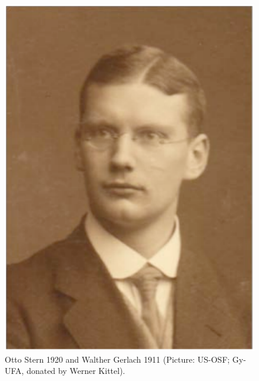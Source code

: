 \documentclass{article}
\begin{document}
\begin{figure}
\begin{center}
\includegraphics[scale=0.505]{figures/Gerlach1911}
\caption{Otto Stern 1920 and Walther Gerlach 1911 (Picture: US-OSF; Gy-UFA, donated by Werner Kittel).}
\label{fig:SternGerlach}
\end{center}
\end{figure}
%
\end{document}
